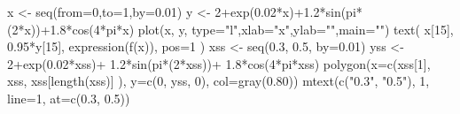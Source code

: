 \begin{Schunk}
\begin{Sinput}
 x <- seq(from=0,to=1,by=0.01)
 y <- 2+exp(0.02*x)+1.2*sin(pi*(2*x))+1.8*cos(4*pi*x)
 plot(x, y, type="l",xlab="x",ylab="",main="")
 text( x[15], 0.95*y[15], expression(f(x)), pos=1 )
 xss <- seq(0.3, 0.5, by=0.01)
 yss <- 2+exp(0.02*xss)+ 1.2*sin(pi*(2*xss))+ 1.8*cos(4*pi*xss)
 polygon(x=c(xss[1], xss, xss[length(xss)] ), y=c(0, yss, 0), col=gray(0.80))
 mtext(c("0.3", "0.5"), 1, line=1, at=c(0.3, 0.5))
\end{Sinput}
\end{Schunk}
